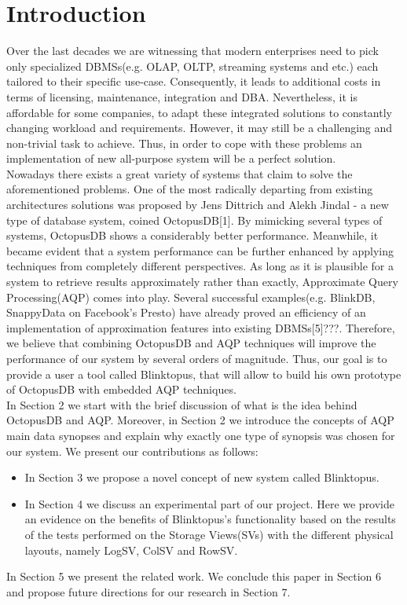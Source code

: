 \documentclass[10pt, conference, compsocconf]{IEEEtran}
\begin{document}
\section{Introduction}
Over the last decades we are witnessing that modern enterprises need to pick only  specialized DBMSs(e.g. OLAP, OLTP, streaming systems and etc.) each tailored to their specific use-case. Consequently, it leads to additional costs in terms of licensing, maintenance, integration and DBA. Nevertheless, it is affordable for some companies, to adapt these integrated solutions to constantly changing workload and requirements. However, it may still be a challenging and non-trivial task to achieve. Thus, in order to cope with these problems an implementation of new all-purpose system will be a perfect solution. \\ Nowadays there exists a great variety of systems that claim to solve the aforementioned problems. One of the most radically departing from existing architectures solutions was proposed by Jens Dittrich and Alekh Jindal - a new type of database system, coined OctopusDB[1]. By mimicking several types of systems, OctopusDB shows a considerably better performance. Meanwhile, it became evident that a system performance can be further enhanced by applying techniques from completely different perspectives. As long as it is plausible for a system to retrieve results approximately rather than exactly, Approximate Query Processing(AQP) comes into play. Several successful examples(e.g. BlinkDB, SnappyData on Facebook's Presto) have already proved an efficiency of an implementation of approximation features into existing DBMSs[5]???. Therefore, we believe that combining OctopusDB and AQP techniques will improve the performance of our system by several orders of magnitude. 
Thus, our goal is to provide a user a tool called Blinktopus, that will allow  to build his own prototype of OctopusDB with embedded AQP techniques.\\
In Section 2 we start with the brief discussion of what is the idea behind OctopusDB and AQP. Moreover, in Section 2 we introduce the concepts of AQP main data synopses and explain why exactly one type of synopsis was chosen for our system. We present our contributions as follows:
\begin{itemize}
\vspace{0.05 cm}
\item{In Section 3 we propose a novel concept of new system called Blinktopus.}
\item{In Section 4 we discuss an experimental part of our project. Here we provide an evidence on the benefits of Blinktopus's functionality based on the results of the tests performed on the Storage Views(SVs) with the different physical layouts, namely LogSV, ColSV and RowSV.}
\end{itemize}
In Section 5 we present the related work. We conclude this paper in Section 6 and propose future directions for our research in Section 7.
\end{document}
